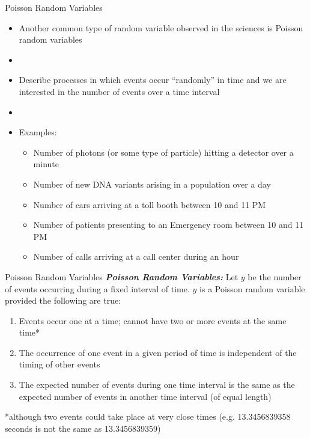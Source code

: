 \documentclass[xcolor=dvipsnames]{beamer}
\begin{document}
\begin{frame}{Poisson Random Variables}
	\begin{itemize}
		\item Another common type of random variable observed in the sciences is Poisson random variables \pause
		\item[]
		\item Describe processes in which events occur ``randomly'' in time and we are interested in the number of events over a time interval \pause
		\item[]
		\item Examples: 
		\begin{itemize}
			\item Number of photons (or some type of particle) hitting a detector over a minute \pause
			\item Number of new DNA variants arising in a population over a day \pause
			\item Number of cars arriving at a toll booth between 10 and 11 PM \pause
			\item Number of patients presenting to an Emergency room between 10 and 11 PM \pause
			\item Number of calls arriving at a call center during an hour
		\end{itemize}
	\end{itemize}
\end{frame}

\begin{frame}{Poisson Random Variables}
	\textbf{\emph{Poisson Random Variables:}} Let $y$ be the number of events occurring during a fixed interval of time. $y$ is a Poisson random variable provided the following are true: \pause
		\begin{enumerate}
			\item Events occur one at a time; cannot have two or more events at the same time* \pause
			\item The occurrence of one event in a given period of time is independent of the timing of other events \pause
			\item The expected number of events during one time interval is the same as the expected number of events in another time interval (of equal length) \pause
		\end{enumerate}
		{\tiny
			*although two events could take place at very close times (e.g. 13.3456839358 seconds is not the same as 13.3456839359)}
\end{frame}
\end{document}
